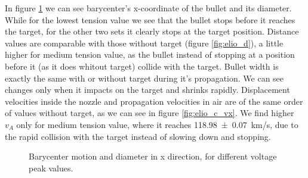 In figure \ref{fig:elio_c_xb} we can see barycenter's x-coordinate of the bullet and its diameter. While for the lowest tension value we see that the bullet stops before it reaches the target, for the other two sets it clearly stops at the target position. Distance values are comparable with those without target (figure \ref{fig:elio_d}), a little higher for medium tension value, as the bullet instead of stopping at a position before it (as it does whitout target) collide with the target.
Bullet width is exactly the same with or without target during it's propagation. We can see changes only when it impacts on the target and shrinks rapidly.
Displacement velocities inside the nozzle and propagation velocities in air are of the same order of values without target, as we can see in figure \ref{fig:elio_c_vx}. We find higher $v_{A}$ only for medium tension value, where it reaches \SI{118.98(7)}{\kilo\meter/\second}, due to the rapid collision with the target instead of slowing down and stopping.
\begin{figure}
 \centering
 \hfill
 \caption{Barycenter motion and diameter in x direction, for different voltage peak values.}
 \label{fig:elio_c_xb}
\end{figure}

